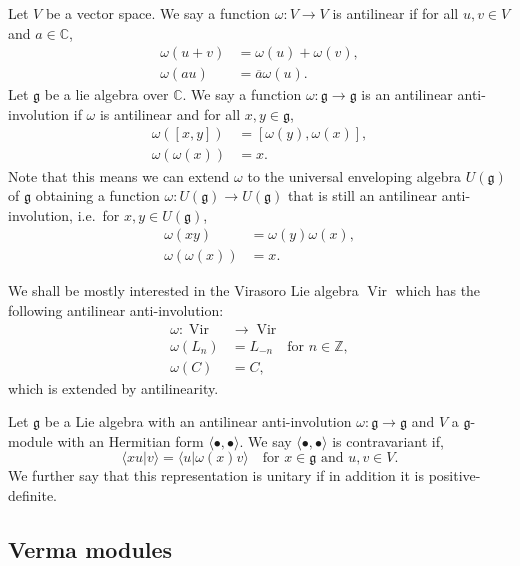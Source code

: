 \documentclass[a4paper, 12pt, reqno]{amsart}
\theoremstyle{remark}
\numberwithin{equation}{subsection}
\DeclareMathOperator{\Vir}{Vir}
\begin{document}
Let $V$ be a  vector space.
We say a function $\omega: V \to V$ is antilinear if for all $u, v \in V$ and $a \in \mathbb{C}$,
\begin{align*}
  \omega(u + v) &= \omega(u) + \omega(v), \\
  \omega(au) &= \overline{a}\omega(u).
\end{align*}
Let $\mathfrak{g}$ be a lie algebra over $\mathbb{C}$.
We say a function $\omega: \mathfrak{g} \to \mathfrak{g}$ is an antilinear anti-involution if $\omega$ is antilinear and for all $x, y \in \mathfrak{g}$,
\begin{align*}
  \omega([x, y]) &= [\omega(y), \omega(x)], \\
  \omega(\omega(x)) &= x.
\end{align*}
Note that this means we can extend $\omega$ to the universal enveloping algebra $U(\mathfrak{g})$ of $\mathfrak{g}$ obtaining a function $\omega: U(\mathfrak{g}) \to U(\mathfrak{g})$ that is still an antilinear anti-involution, i.e.\ for $x, y \in U(\mathfrak{g})$,
\begin{align*}
  \omega(xy) &= \omega(y)\omega(x), \\
  \omega(\omega(x)) &= x.
\end{align*}

We shall be mostly interested in the Virasoro Lie algebra $\Vir$ which has the following antilinear anti-involution:
\begin{align*}
  \omega: \Vir &\to \Vir \\
  \omega(L_n) &= L_{-n} \quad \text{for }n \in \mathbb{Z}, \\
  \omega(C) &= C,
\end{align*}
which is extended by antilinearity.

Let $\mathfrak{g}$ be a Lie algebra with an antilinear anti-involution $\omega: \mathfrak{g} \to \mathfrak{g}$ and $V$ a $\mathfrak{g}$-module with an Hermitian form $\langle \bullet, \bullet \rangle$.
We say $\langle \bullet, \bullet \rangle$ is contravariant if,
\begin{equation*}
  \langle xu| v \rangle = \langle u| \omega(x)v\rangle \quad \text{for }x \in \mathfrak{g}\text{ and }u, v \in V.
\end{equation*}
We further say that this representation is unitary if in addition it is positive-definite.

\subsection{Verma modules}
\label{sec:verma-modules}
\end{document}
